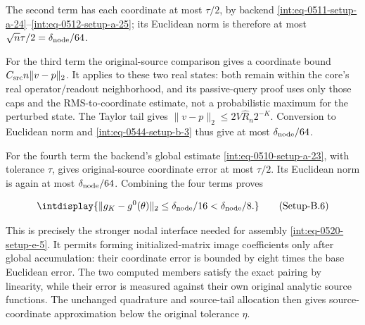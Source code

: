 
The second term has each coordinate at most \(\tau/2\), by backend \hyperref[int:eq-setup-a-24]{\eqref{int:eq-0511-setup-a-24}}--\allowbreak \hyperref[int:eq-setup-a-25]{\eqref{int:eq-0512-setup-a-25}}; its Euclidean norm is therefore at most \(\sqrt n\tau/2=\delta_{\rm node}/64\).



For the third term the original-source comparison gives a coordinate bound \(C_{\rm src}n\|v-p\|_2\). It applies to these two real states: both remain within the core's real operator/readout neighborhood, and its passive-query proof uses only those caps and the RMS-to-coordinate estimate, not a probabilistic maximum for the perturbed state. The Taylor tail gives \(\|v-p\|_2\le2V\widehat R_n2^{-K}\). Conversion to Euclidean norm and \hyperref[int:eq-setup-b-3]{\eqref{int:eq-0544-setup-b-3}} thus give at most \(\delta_{\rm node}/64\).



For the fourth term the backend's global estimate \hyperref[int:eq-setup-a-23]{\eqref{int:eq-0510-setup-a-23}}, with tolerance \(\tau\), gives original-source coordinate error at most \(\tau/2\). Its Euclidean norm is again at most \(\delta_{\rm node}/64\). Combining the four terms proves


\label{int:eq-setup-b-6}
\begingroup\renewcommand{\theHequation}{intdisplay.1038}
\begin{equation}
\intdisplay{
\|g_K-g^0(\theta)\|_2\le\delta_{\rm node}/16
                              <\delta_{\rm node}/8.
}
\tag{Setup-B.6}
\label{int:eq-0547-setup-b-6}
\end{equation}
\endgroup


This is precisely the stronger nodal interface needed for assembly \hyperref[int:eq-setup-e-5]{\eqref{int:eq-0520-setup-e-5}}. It permits forming initialized-matrix image coefficients only after global accumulation: their coordinate error is bounded by eight times the base Euclidean error. The two computed members satisfy the exact pairing by linearity, while their error is measured against their own original analytic source functions. The unchanged quadrature and source-tail allocation then gives source-coordinate approximation below the original tolerance \(\eta\).


